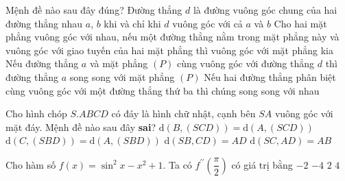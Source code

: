 \begin{ex}%
Mệnh đề nào sau đây đúng?
\choice%
{Đường thẳng $d$ là đường vuông góc chung của hai đường thẳng nhau $a$, $b$ khi và chỉ khi $d$ vuông góc với cả $a$ và $b$}
{\True Cho hai mặt phẳng vuông góc với nhau, nếu một đường thẳng nằm trong mặt phẳng này và vuông góc với giao tuyến của hai mặt phẳng thì vuông góc với mặt phẳng kia}
{Nếu đường thẳng $a$ và mặt phẳng $(P)$ cùng vuông góc với đường thẳng $d$ thì đường thẳng $a$ song song với mặt phẳng $(P)$}
{Nếu hai đường thẳng phân biệt cùng vuông góc với một đường thẳng thứ ba thì chúng song song với nhau}
\end{ex}
\begin{ex}%
Cho hình chóp $S.ABCD$ có đáy là hình chữ nhật, cạnh bên $SA$ vuông góc với mặt đáy. Mệnh đề nào sau đây {\bf sai}?
\choice%
{$\mathrm{d}(B,(SCD))=\mathrm{d}(A,(SCD))$}
{$\mathrm{d}(C,(SBD))=\mathrm{d}(A,(SBD))$}
{$\mathrm{d}(SB,CD)=AD$}
{\True $\mathrm{d}(SC,AD)=AB$}
\end{ex}
\begin{ex}%
Cho hàm số $f(x)=\sin^2x-x^2+1$. Ta có $f^{\prime \prime}\left(\dfrac{\pi}{2}\right)$ có giá trị bằng
\choice%
{$-2$}
{\True $-4$}
{$2$}
{$4$}
\end{ex}
